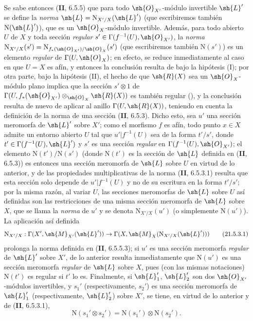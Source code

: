 \begin{env}[21.5.3]
Se sabe entonces (\textbf{II}, 6.5.5) que para todo $\sh{O}_{X'}$-módulo invertible $\sh{L}'$ se define la \emph{norma} $\sh{L}=\mathrm{N}_{X'/X}(\sh{L}')$ (que escribiremos también $\mathrm{N}(\sh{L}')$), que es un $\sh{O}_X$-módulo invertible.
Además, para todo abierto $U$ de $X$ y toda sección \emph{regular} $s'\in\Gamma(f^{-1}(U),\sh{O}_{X'})$, la \emph{norma} $\mathrm{N}_{X'/X}(s')=\mathrm{N}_{f_*(\sh{O}_{X'})/\sh{O}_X}(s')$ (que escribiremos también $\mathrm{N}(s')$) es un elemento \emph{regular} de $\Gamma(U,\sh{O}_X)$;
en efecto, se reduce inmediatamente al caso en que $U=X$ es afín, y entonces la conclusión resulta de  bajo la hipótesis (I);
por otra parte, bajo la hipótesis (II), el hecho de que $\sh{R}(X)$ sea un $\sh{O}_X$-módulo plano implica que la sección $s'\otimes1$ de $\Gamma(U,f_*(\sh{O}_{X'})\otimes_{\sh{O}_X}\sh{R}(X))$ es también regular (), y la conclusión resulta de nuevo de aplicar  al anillo $\Gamma(U,\sh{R}(X))$, teniendo en cuenta la definición de la norma de una sección (\textbf{II}, 6.5.3).
Dicho esto, sea $u'$ una sección meromorfa de $\sh{L}'$ sobre $X'$;
como el morfismo $f$ es afín, todo punto $x\in X$ admite un entorno abierto $U$ tal que $u'|f^{-1}(U)$ sea de la forma $t'/s'$, donde $t'\in\Gamma(f^{-1}(U),\sh{L}')$ y $s'$ es una sección \emph{regular} en $\Gamma(f^{-1}(U),\sh{O}_{X'})$;
el elemento $\mathrm{N}(t')/\mathrm{N}(s')$ (donde $\mathrm{N}(t')$ es la sección de $\sh{L}$ definida en (\textbf{II}, 6.5.3)) es entonces una sección meromorfa de $\sh{L}$ sobre $U$ en virtud de lo anterior, y de las propiedades multiplicativas de la norma (\textbf{II}, 6.5.3.1) resulta que esta sección solo depende de $u'|f^{-1}(U)$ y no de su escritura en la forma $t'/s'$;
por la misma razón, al variar $U$, las secciones meromorfas de $\sh{L}$ sobre $U$ así definidas son las restricciones de una misma sección meromorfa de $\sh{L}$ sobre $X$, que se llama la \emph{norma} de $u'$ y se denota $\mathrm{N}_{X'/X}(u')$ (o simplemente $\mathrm{N}(u')$).
La aplicación así definida
\[
\label{IV.21.5.3.1}
  \mathrm{N}_{X'/X}:\Gamma(X',\sh{M}_{X'}(\sh{L}'))\to\Gamma(X,\sh{M}_X(\mathrm{N}_{X'/X}(\sh{L}')))
  \tag{21.5.3.1}
\]
prolonga la norma definida en (\textbf{II}, 6.5.5.3);
si $u'$ es una sección meromorfa \emph{regular} de $\sh{L}'$ sobre $X'$, de lo anterior resulta inmediatamente que $\mathrm{N}(u')$ es una sección meromorfa \emph{regular} de $\sh{L}$ sobre $X$, pues (con las mismas notaciones) $\mathrm{N}(t')$ es regular si $t'$ lo es.
Finalmente, si $\sh{L}_1'$, $\sh{L}_2'$ son dos $\sh{O}_{X'}$-módulos invertibles, y $s_1'$ (respectivamente, $s_2'$) es una sección meromorfa de $\sh{L}_1'$ (respectivamente, $\sh{L}_2'$) sobre $X'$, se tiene, en virtud de lo anterior y de (\textbf{II}, 6.5.3.1),
\[
\label{IV.21.5.3.2}
  \mathrm{N}(s_1'\otimes s_2')=\mathrm{N}(s_1')\otimes\mathrm{N}(s_2').
  \tag{21.5.3.2}
\]
\end{env}

